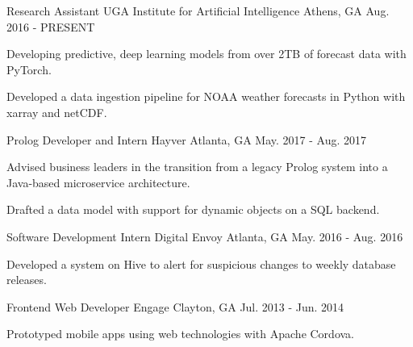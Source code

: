 \begin{cventries}

\cventry
{Research Assistant}
{UGA Institute for Artificial Intelligence}
{Athens, GA}
{Aug. 2016 - PRESENT}
{\begin{cvitems}
    \item {Developing predictive, deep learning models from over 2TB of forecast data with PyTorch.}
    \item {Developed a data ingestion pipeline for NOAA weather forecasts in Python with xarray and netCDF.}
\end{cvitems}}

\cventry
{Prolog Developer and Intern}
{Hayver}
{Atlanta, GA}
{May. 2017 - Aug. 2017}
{\begin{cvitems}
    \item {Advised business leaders in the transition from a legacy Prolog system into a Java-based microservice architecture.}
    \item {Drafted a data model with support for dynamic objects on a SQL backend.}
\end{cvitems}}

\cventry
{Software Development Intern}
{Digital Envoy}
{Atlanta, GA}
{May. 2016 - Aug. 2016}
{\begin{cvitems}
    \item {Developed a system on Hive to alert for suspicious changes to weekly database releases.}
\end{cvitems}}

\cventry
{Frontend Web Developer}
{Engage}
{Clayton, GA}
{Jul. 2013 - Jun. 2014}
{{\begin{cvitems}
    \item {Prototyped mobile apps using web technologies with Apache Cordova.}
\end{cvitems}}}

\end{cventries}
